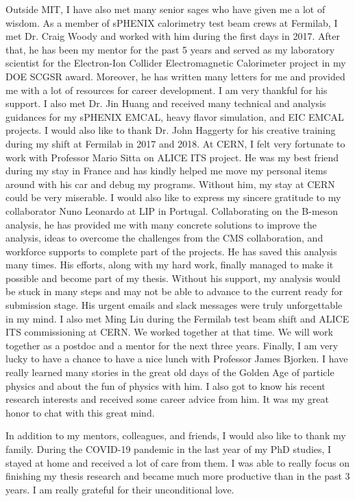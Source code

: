 Outside MIT, I have also met many senior sages who have given me a lot of wisdom. As a member of sPHENIX calorimetry test beam crews at Fermilab, I met Dr. Craig Woody and worked with him during the first days in 2017. After that, he has been my mentor for the past 5 years and served as my laboratory scientist for the Electron-Ion Collider Electromagnetic Calorimeter project in my DOE SCGSR award. Moreover, he has written many letters for me and provided me with a lot of resources for career development. I am very thankful for his support. I also met Dr. Jin Huang and received many technical and analysis guidances for my sPHENIX EMCAL, heavy flavor simulation, and EIC EMCAL projects. I would also like to thank Dr. John Haggerty for his creative training during my shift at Fermilab in 2017 and 2018. At CERN, I felt very fortunate to work with Professor Mario Sitta on ALICE ITS project. He was my best friend during my stay in France and has kindly helped me move my personal items around with his car and debug my programs. Without him, my stay at CERN could be very miserable. I would also like to express my sincere gratitude to my collaborator Nuno Leonardo at LIP in Portugal. Collaborating on the B-meson analysis, he has provided me with many concrete solutions to improve the analysis, ideas to overcome the challenges from the CMS collaboration, and workforce supports to complete part of the projects. He has saved this analysis many times. His efforts, along with my hard work, finally managed to make it possible and become part of my thesis. Without his support, my analysis would be stuck in many steps and may not be able to advance to the current ready for submission stage. His urgent emails and slack messages were truly unforgettable in my mind. I also met Ming Liu during the Fermilab test beam shift and ALICE ITS commissioning at CERN. We worked together at that time. We will work together as a postdoc and a mentor for the next three years. Finally, I am very lucky to have a chance to have a nice lunch with Professor James Bjorken. I have really learned many stories in the great old days of the Golden Age of particle physics and about the fun of physics with him. I also got to know his recent research interests and received some career advice from him. It was my great honor to chat with this great mind.

In addition to my mentors, colleagues, and friends, I would also like to thank my family. During the COVID-19 pandemic in the last year of my PhD studies, I stayed at home and received a lot of care from them. I was able to really focus on finishing my thesis research and became much more productive than in the past 3 years. I am really grateful for their unconditional love. 

